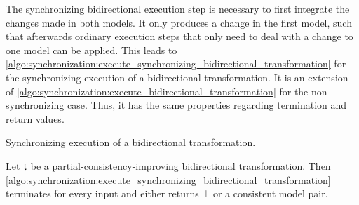 The synchronizing bidirectional execution step is necessary to first integrate the changes made in both models.
It only produces a change in the first model, such that afterwards ordinary execution steps that only need to deal with a change to one model can be applied.
This leads to \autoref{algo:synchronization:execute_synchronizing_bidirectional_transformation} for the synchronizing execution of a bidirectional transformation.
%
It is an extension of \autoref{algo:synchronization:execute_bidirectional_transformation} for the non-synchronizing case.
Thus, it has the same properties regarding termination and return values.

\begin{algorithm}
    
    \caption[Synchronizing execution of a bidirectional transformation]{Synchronizing execution of a bidirectional transformation.}
    \label{algo:synchronization:execute_synchronizing_bidirectional_transformation}
\end{algorithm}

\begin{theorem}
    \label{theorem:synchronizingbidirectionaltransformationconsistencytermination}
    Let $\transformation{t}$ be a partial-consistency-improving bidirectional transformation.
    Then \autoref{algo:synchronization:execute_synchronizing_bidirectional_transformation} terminates for every input and either returns $\bot$ or a consistent model pair.
\end{theorem}

